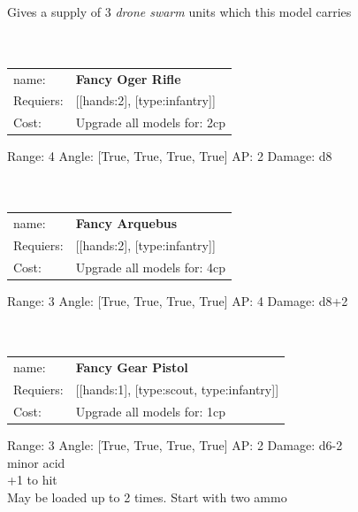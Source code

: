 Gives a supply of 3 {{\it drone swarm}} units which this model carries\\ 









\ \\
\ \\
\begin{tabular}{ll}
name: & {\bf Fancy Oger Rifle } \\
Requiers: & [[hands:2], [type:infantry]] \\
Cost: & Upgrade all models for: 2cp \\
\end{tabular}



Range: 4  Angle: [True, True, True, True] AP: 2 Damage: d8 \\








\ \\
\ \\
\begin{tabular}{ll}
name: & {\bf Fancy Arquebus } \\
Requiers: & [[hands:2], [type:infantry]] \\
Cost: & Upgrade all models for: 4cp \\
\end{tabular}



Range: 3  Angle: [True, True, True, True] AP: 4 Damage: d8+2 \\








\ \\
\ \\
\begin{tabular}{ll}
name: & {\bf Fancy Gear Pistol } \\
Requiers: & [[hands:1], [type:scout, type:infantry]] \\
Cost: & Upgrade all models for: 1cp \\
\end{tabular}



Range: 3  Angle: [True, True, True, True] AP: 2 Damage: d6-2 \\
minor acid\\ 
+1 to hit\\ 
May be loaded up to 2 times. Start with two ammo\\ 








